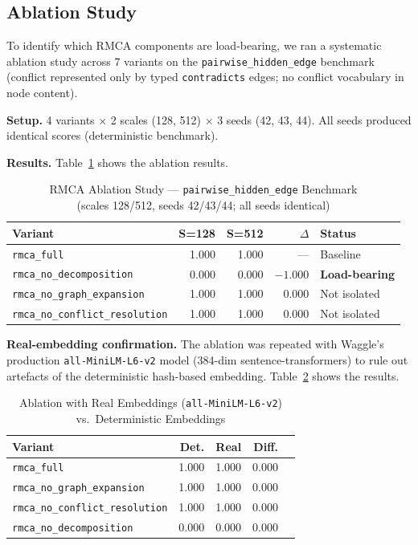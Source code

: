 \documentclass[conference]{IEEEtran}
\begin{document}
\subsection{Ablation Study}

To identify which RMCA components are load-bearing, we ran a systematic ablation study
across 7 variants on the \texttt{pairwise\_hidden\_edge} benchmark (conflict represented
only by typed \texttt{contradicts} edges; no conflict vocabulary in node content).

\textbf{Setup.} 4 variants $\times$ 2 scales (128, 512) $\times$ 3 seeds (42, 43, 44).
All seeds produced identical scores (deterministic benchmark).

\textbf{Results.} Table~\ref{tab:ablation} shows the ablation results.

\begin{table}[htbp]
\caption{RMCA Ablation Study --- \texttt{pairwise\_hidden\_edge} Benchmark\\
(scales 128/512, seeds 42/43/44; all seeds identical)}
\label{tab:ablation}
\centering
\begin{tabular}{lrrrp{2.0cm}}
\toprule
\textbf{Variant} & \textbf{S=128} & \textbf{S=512} & \textbf{$\Delta$} & \textbf{Status} \\
\midrule
\texttt{rmca\_full}               & 1.000 & 1.000 & ---    & Baseline \\
\texttt{rmca\_no\_decomposition}  & 0.000 & 0.000 & $-1.000$ & \textbf{Load-bearing} \\
\texttt{rmca\_no\_graph\_expansion} & 1.000 & 1.000 & 0.000 & Not isolated \\
\texttt{rmca\_no\_conflict\_resolution} & 1.000 & 1.000 & 0.000 & Not isolated \\
\bottomrule
\end{tabular}
\end{table}

\textbf{Real-embedding confirmation.} The ablation was repeated with Waggle's production
\texttt{all-MiniLM-L6-v2} model (384-dim sentence-transformers) to rule out artefacts of
the deterministic hash-based embedding. Table~\ref{tab:ablation_real} shows the results.

\begin{table}[htbp]
\caption{Ablation with Real Embeddings (\texttt{all-MiniLM-L6-v2})\\
vs.\ Deterministic Embeddings}
\label{tab:ablation_real}
\centering
\begin{tabular}{lrrrr}
\toprule
\textbf{Variant} & \textbf{Det.} & \textbf{Real} & \textbf{Diff.} \\
\midrule
\texttt{rmca\_full}               & 1.000 & 1.000 & 0.000 \\
\texttt{rmca\_no\_graph\_expansion} & 1.000 & 1.000 & 0.000 \\
\texttt{rmca\_no\_conflict\_resolution} & 1.000 & 1.000 & 0.000 \\
\texttt{rmca\_no\_decomposition}  & 0.000 & 0.000 & 0.000 \\
\bottomrule
\end{tabular}
\end{table}
\end{document}
